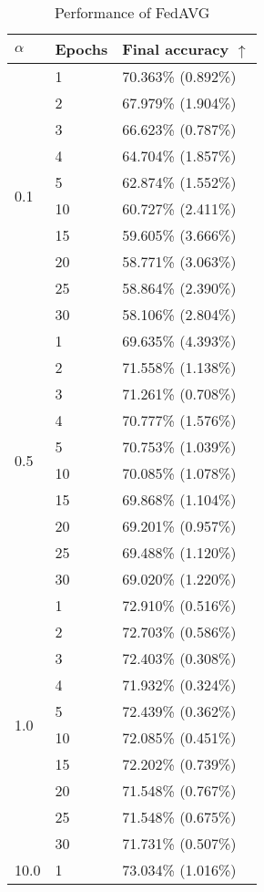 \documentclass[conference,compsoc]{IEEEtran}
\begin{document}
\begin{table}[ht]
\centering
\caption{Performance of FedAVG}
    \centering
    \begin{tabular}{lll}
    \hline
    \textbf{$\alpha$} & \textbf{Epochs} & \textbf{Final accuracy $\uparrow$} \\
    \hline
    \multirow{10}{*}{0.1} & 1 & 70.363\% (0.892\%) \\
    & 2 & 67.979\% (1.904\%) \\
    & 3 & 66.623\% (0.787\%) \\
    & 4 & 64.704\% (1.857\%) \\
    & 5 & 62.874\% (1.552\%) \\
    & 10 & 60.727\% (2.411\%) \\
    & 15 & 59.605\% (3.666\%) \\
    & 20 & 58.771\% (3.063\%) \\
    & 25 & 58.864\% (2.390\%) \\
    & 30 & 58.106\% (2.804\%) \\
    \hline
    \multirow{10}{*}{0.5} & 1 & 69.635\% (4.393\%) \\
    & 2 & 71.558\% (1.138\%) \\
    & 3 & 71.261\% (0.708\%) \\
    & 4 & 70.777\% (1.576\%) \\
    & 5 & 70.753\% (1.039\%) \\
    & 10 & 70.085\% (1.078\%) \\
    & 15 & 69.868\% (1.104\%) \\
    & 20 & 69.201\% (0.957\%) \\
    & 25 & 69.488\% (1.120\%) \\
    & 30 & 69.020\% (1.220\%) \\
    \hline
    \multirow{10}{*}{1.0} & 1 & 72.910\% (0.516\%) \\
    & 2 & 72.703\% (0.586\%) \\
    & 3 & 72.403\% (0.308\%) \\
    & 4 & 71.932\% (0.324\%) \\
    & 5 & 72.439\% (0.362\%) \\
    & 10 & 72.085\% (0.451\%) \\
    & 15 & 72.202\% (0.739\%) \\
    & 20 & 71.548\% (0.767\%) \\
    & 25 & 71.548\% (0.675\%) \\
    & 30 & 71.731\% (0.507\%) \\
    \hline
    \multirow{10}{*}{10.0} & 1 & 73.034\% (1.016\%) \\

\end{tabular}
\end{table}
\end{document}
